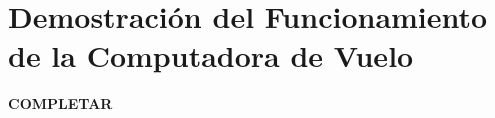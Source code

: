 \section{Demostración del Funcionamiento de la Computadora de Vuelo}

\textbf{{\color{red} COMPLETAR}}